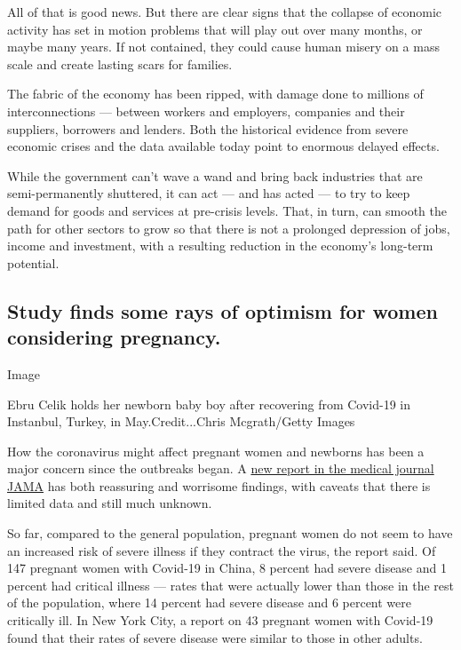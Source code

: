 All of that is good news. But there are clear signs that the collapse of
economic activity has set in motion problems that will play out over
many months, or maybe many years. If not contained, they could cause
human misery on a mass scale and create lasting scars for families.

The fabric of the economy has been ripped, with damage done to millions
of interconnections --- between workers and employers, companies and
their suppliers, borrowers and lenders. Both the historical evidence
from severe economic crises and the data available today point to
enormous delayed effects.

While the government can't wave a wand and bring back industries that
are semi-permanently shuttered, it can act --- and has acted --- to try
to keep demand for goods and services at pre-crisis levels. That, in
turn, can smooth the path for other sectors to grow so that there is not
a prolonged depression of jobs, income and investment, with a resulting
reduction in the economy's long-term potential.

\hypertarget{study-finds-some-rays-of-optimism-for-women-considering-pregnancy}{%
\subsection{Study finds some rays of optimism for women considering
pregnancy.}\label{study-finds-some-rays-of-optimism-for-women-considering-pregnancy}}

Image

Ebru Celik holds her newborn baby boy after recovering from Covid-19 in
Instanbul, Turkey, in May.Credit...Chris Mcgrath/Getty Images

How the coronavirus might affect pregnant women and newborns has been a
major concern since the outbreaks began. A
\href{https://slack-redir.net/link?url=https\%3A\%2F\%2Fjamanetwork.com\%2Fjournals\%2Fjama\%2Ffullarticle\%2F2767060\%3FguestAccessKey\%3Dcdf30829-77bc-4a44-88ec-5eaee89b19ec\%26utm_source\%3DFor_The_Media\%26utm_medium\%3Dreferral\%26utm_campaign\%3Dftm_links\%26utm_content\%3Dtfl\%26utm_term\%3D060520}{new
report in the medical journal JAMA} has both reassuring and worrisome
findings, with caveats that there is limited data and still much
unknown.

So far, compared to the general population, pregnant women do not seem
to have an increased risk of severe illness if they contract the virus,
the report said. Of 147 pregnant women with Covid-19 in China, 8 percent
had severe disease and 1 percent had critical illness --- rates that
were actually lower than those in the rest of the population, where 14
percent had severe disease and 6 percent were critically ill. In New
York City, a report on 43 pregnant women with Covid-19 found that their
rates of severe disease were similar to those in other adults.

